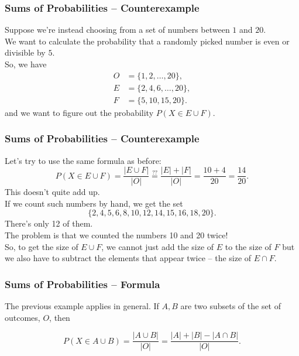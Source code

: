\documentclass[aspectratio=169,11pt,usenames,dvipsnames]{beamer}
\begin{document}
\begin{frame}
 \frametitle{Sums of Probabilities -- Counterexample}
 Suppose we're instead choosing from a set of numbers between $1$ and
 $20$.\pause\\
 We want to calculate the probability that a randomly picked number is
 \alert{even or divisible by $5$}.\pause\\
 So, we have
 \begin{align*}
  O &= \{1,2,\ldots,20\},\\
  E &= \{2,4,6,\ldots,20\},\\
  F &= \{5,10,15,20\}.
 \end{align*}\pause
 and we want to figure out the probability $P(X \in E \cup F)$.
\end{frame}

\begin{frame}
 \frametitle{Sums of Probabilities -- Counterexample}
 Let's try to use the same formula as before:
 \[
  P(X \in E \cup F) = \frac{|E \cup F|}{|O|} \overset{??}{=} \frac{|E| +
  |F|}{|O|} = \frac{10 + 4}{20} = \frac{14}{20}.
 \]\pause
 This doesn't quite add up.\pause\\
 If we count such numbers by hand, we get the set
 \[
  \{2,4,5,6,8,10,12,14,15,16,18,20\}.
 \]
 \pause
 There's \alert{only 12 of them}.\pause\\
 The problem is that \alert{we counted the numbers 10 and 20 twice}!\pause\\
 So, to get the size of $E \cup F$, we cannot just add the size of $E$ to the
 size of $F$ but we also have to subtract the elements that appear twice -- the
 size of $E \cap F$.
\end{frame}

\begin{frame}
 \frametitle{Sums of Probabilities -- Formula}
 The previous example applies in general. If $A,B$ are two subsets of the set of
 outcomes, $O$, then\pause
 \begin{tcolorbox}
  \[
   P(X \in A \cup B) = \frac{|A \cup B|}{|O|} = \frac{|A| + |B| - |A \cap
   B|}{|O|}.
  \]
 \end{tcolorbox}
\end{frame}
\end{document}
